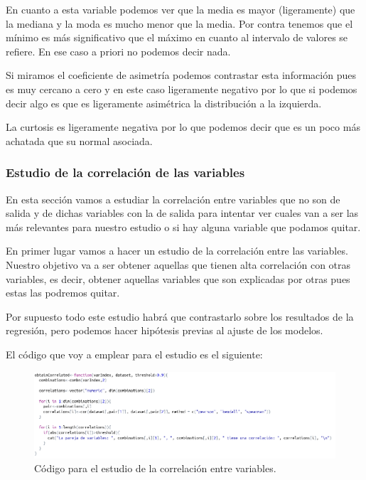 \documentclass[12pt,a4paper]{article}
\begin{document}
En cuanto a esta variable podemos ver que la media es mayor (ligeramente) que la mediana y la moda es mucho menor que la media. Por contra tenemos que el mínimo es más significativo que el máximo en cuanto al intervalo de valores se refiere. En ese caso a priori no podemos decir nada.

Si miramos el coeficiente de asimetría podemos contrastar esta información pues es muy cercano a cero y en este caso ligeramente negativo por lo que si podemos decir algo es que es ligeramente asimétrica la distribución a la izquierda.

La curtosis es ligeramente negativa por lo que podemos decir que es un poco más achatada que su normal asociada.

\subsubsection{Estudio de la correlación de las variables}

En esta sección vamos a estudiar la correlación entre variables que no son de salida y de dichas variables con la de salida para intentar ver cuales van a ser las más relevantes para nuestro estudio o si hay alguna variable que podamos quitar.

En primer lugar vamos a hacer un estudio de la correlación entre las variables. Nuestro objetivo va a ser obtener aquellas que tienen alta correlación con otras variables, es decir, obtener aquellas variables que son explicadas por otras pues estas las podremos quitar.

Por supuesto todo este estudio habrá que contrastarlo sobre los resultados de la regresión, pero podemos hacer hipótesis previas al ajuste de los modelos.

El código que voy a emplear para el estudio es el siguiente:

\begin{figure}[H]
	\centering
	\includegraphics[scale=0.51]{./Imagenes/correlacion_entre_variables_codigo.png}
	\caption{Código para el estudio de la correlación entre variables.}
\end{figure}
\end{document}
